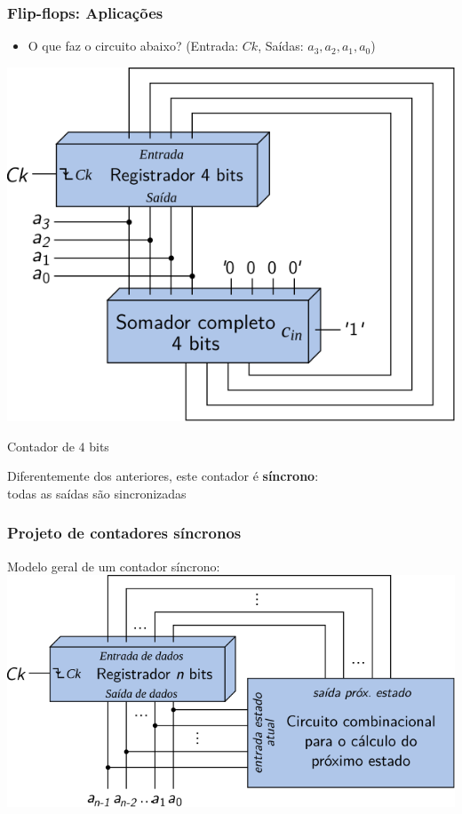 \documentclass{beamer}
\begin{document}
\begin{frame}
\frametitle{Flip-flops: Aplicações}

\begin{itemize}
\item O que faz o circuito abaixo? (Entrada: $Ck$, Saídas: $a_3, a_2, a_1, a_0$)
\end{itemize}

\begin{minipage}{0.6\textwidth}
\includegraphics[scale=0.95]{images/sync_counter}
\end{minipage}
\hfill\pause%
\begin{minipage}{0.3\textwidth}
Contador de $4$ bits\\[12pt]

\pause

Diferentemente dos anteriores,
este contador é
\textbf{síncrono}:\\
todas
as saídas são sincronizadas
\end{minipage}

\end{frame}

\begin{frame}
\frametitle{Projeto de contadores síncronos}

Modelo geral de um contador síncrono:\\[12pt]

\includegraphics{images/sync_counter_general}

\end{frame}
\end{document}
